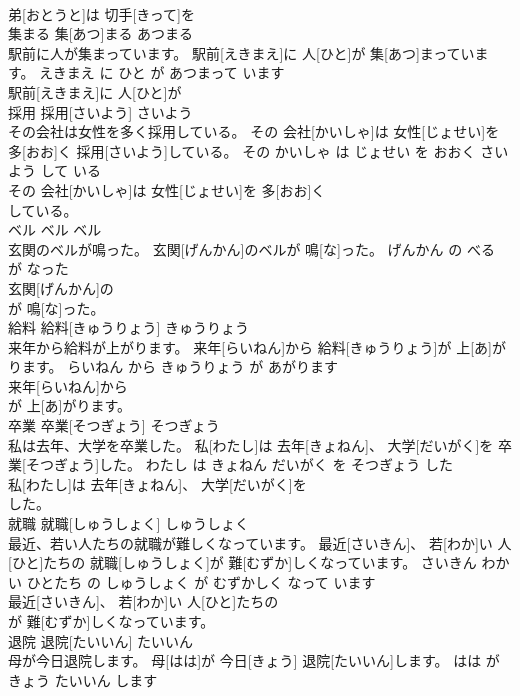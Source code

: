 \documentclass[8pt]{extreport}
\begin{document}
\begin{CJK}{UTF8}{min}
\\	弟[おとうと]は 切手[きって]を
\\	集まる	集[あつ]まる	あつまる	
\\	駅前に人が集まっています。	駅前[えきまえ]に 人[ひと]が 集[あつ]まっています。	えきまえ に ひと が あつまって います	
\\	駅前[えきまえ]に 人[ひと]が
\\	採用	採用[さいよう]	さいよう	
\\	その会社は女性を多く採用している。	その 会社[かいしゃ]は 女性[じょせい]を 多[おお]く 採用[さいよう]している。	その かいしゃ は じょせい を おおく さいよう して いる	
\\	その 会社[かいしゃ]は 女性[じょせい]を 多[おお]く
\\	している。			
\\	ベル	ベル	ベル	
\\	玄関のベルが鳴った。	玄関[げんかん]のベルが 鳴[な]った。	げんかん の べる が なった	
\\	玄関[げんかん]の
\\	が 鳴[な]った。			
\\	給料	給料[きゅうりょう]	きゅうりょう	
\\	来年から給料が上がります。	来年[らいねん]から 給料[きゅうりょう]が 上[あ]がります。	らいねん から きゅうりょう が あがります	
\\	来年[らいねん]から
\\	が 上[あ]がります。			
\\	卒業	卒業[そつぎょう]	そつぎょう	
\\	私は去年、大学を卒業した。	私[わたし]は 去年[きょねん]、 大学[だいがく]を 卒業[そつぎょう]した。	わたし は きょねん だいがく を そつぎょう した	
\\	私[わたし]は 去年[きょねん]、 大学[だいがく]を
\\	した。			
\\	就職	就職[しゅうしょく]	しゅうしょく	
\\	最近、若い人たちの就職が難しくなっています。	最近[さいきん]、 若[わか]い 人[ひと]たちの 就職[しゅうしょく]が 難[むずか]しくなっています。	さいきん わかい ひとたち の しゅうしょく が むずかしく なって います	
\\	最近[さいきん]、 若[わか]い 人[ひと]たちの
\\	が 難[むずか]しくなっています。			
\\	退院	退院[たいいん]	たいいん	
\\	母が今日退院します。	母[はは]が 今日[きょう] 退院[たいいん]します。	はは が きょう たいいん します	

\end{CJK}
\end{document}
